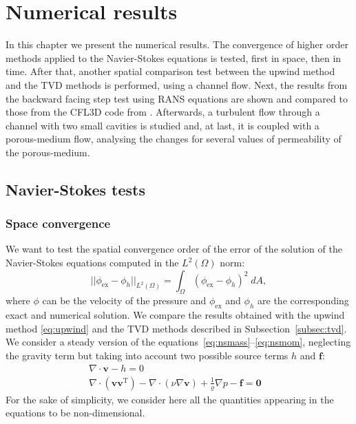 \chapter{Numerical results} \label{chap:results}
In this chapter we present the numerical results. The convergence of higher 
order methods applied to the Navier-Stokes equations is tested, first in space, 
then in time. After that, another spatial comparison test between the upwind 
method 
and the TVD methods is performed, using a channel flow. Next, the results 
from the backward facing step test using RANS equations are shown and 
compared to those from the CFL3D code from \cite{web:nasa}. Afterwards, a 
turbulent 
flow through a channel with two small cavities is studied and, at last, it is 
coupled
with a porous-medium flow, analysing the changes for several values of permeability of the porous-medium.
%
\section{Navier-Stokes tests}
\subsection{Space convergence} \label{subsec:conv}
We want to test the spatial convergence order of the error of the 
solution of the Navier-Stokes equations computed in the $L^2(\Omega)$ norm:
\begin{equation}
	|\!|\phi_\text{ex} - \phi_h|\!|_{L^2(\Omega)} = \int_{\Omega} 
	(\phi_\text{ex} - 
	\phi_h)^2 \; dA,
\end{equation}
where $\phi$ can be the velocity of the pressure and $\phi_\text{ex}$ and 
$\phi_h$ 
are the corresponding exact and numerical solution.
We compare the results obtained with 
the upwind method \eqref{eq:upwind} and the TVD methods described in 
Subsection~\ref{subsec:tvd}.\\
We consider a steady version of the 
equations~\eqref{eq:nsmass}--\eqref{eq:nsmom}, neglecting the gravity term but taking into account two possible source terms $h$ and $\mathbf{f}$:
\begin{align}
	\label{eq:nssteadymass} \nabla \cdot \mathbf{v} -h = 0&\\
	\label{eq:nssteadymom} \nabla \cdot (\mathbf{v} \mathbf{v}^\mathrm{T}) - 
	\nabla \cdot (\nu \nabla \mathbf{v}) + \frac{1}{\varrho}\nabla p  
	-\mathbf{f} = \mathbf{0}&
\end{align}
For the sake of simplicity, we consider here 
all the quantities appearing in the equations to be non-dimensional.
%
